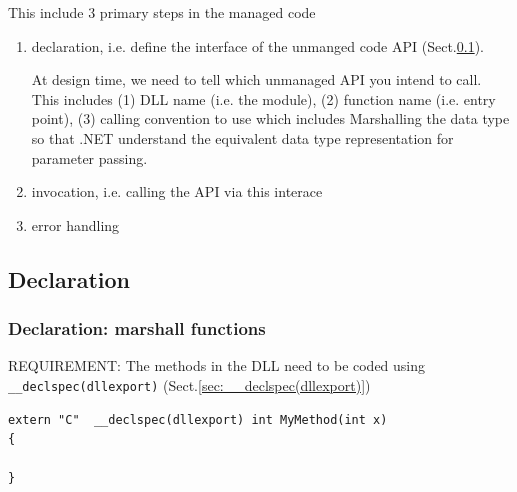   
This include 3 primary steps in the managed
code
\begin{enumerate}
  \item declaration, i.e. define the interface of the unmanged code API (Sect.\ref{sec:P/Invoke_declaration}).
  
     At design time, we need to tell which unmanaged API you intend to call.
     This
includes (1) DLL name (i.e. the module), (2) function name (i.e. entry point),
(3) calling convention to use which includes Marshalling the data type so that
.NET understand the equivalent data type representation for parameter passing.
  
  \item invocation, i.e. calling the API via this interace
  
  
  \item error handling 
\end{enumerate}


\subsection{Declaration}
\label{sec:P/Invoke_declaration}

\subsubsection{Declaration: marshall functions}
\label{sec:marshall_API}

REQUIREMENT: The methods in the DLL need to be coded using 
\verb!__declspec(dllexport)! (Sect.\ref{sec:__declspec(dllexport)})
\begin{verbatim}
extern "C"  __declspec(dllexport) int MyMethod(int x)
{

}
\end{verbatim}

